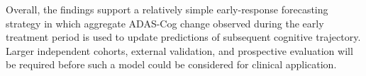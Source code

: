 \documentclass[11pt]{article}
\begin{document}
Overall, the findings support a relatively simple early-response forecasting strategy in which aggregate ADAS-Cog change observed during the early treatment period is used to update predictions of subsequent cognitive trajectory. Larger independent cohorts, external validation, and prospective evaluation will be required before such a model could be considered for clinical application.

\FloatBarrier

%
%
%
%



\end{document}
